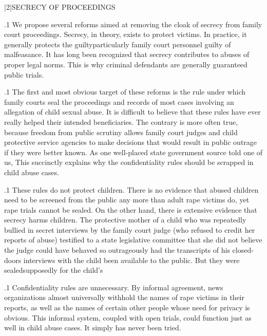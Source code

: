 \documentclass[11pt, twoside]{article}
\begin{document}
{\s|2|{SECRECY OF PROCEEDINGS}

\p.1{%
\noindent{}We propose several reforms aimed at removing the cloak of secrecy from
family court proceedings. Secrecy, in theory, exists to protect victims.
In practice, it generally protects the guilty\mdash{}particularly family court
personnel guilty of malfeasance. It has long been recognized that secrecy contributes to abuses of proper legal norms. This is why criminal
defendants are generally guaranteed public trials.
}%

\p.1{%
The first and most obvious target of these reforms is the  rule under which family courts seal the proceedings and records
of most cases involving an allegation of child sexual abuse. It is difficult
to believe that these rules have ever really helped their intended beneficiaries. The contrary is more often true, because freedom from public
scrutiny allows family court judges and child protective service agencies
to make decisions that would result in public outrage if they were better
known. As one well-placed state government source told one of us,  This succinctly explains why the confidentiality rules should be scrapped in child
abuse cases.
}%

\p.1{%
These rules do not protect children. There is no evidence that abused
children need to be screened from the public any more than adult rape
victims do, yet rape trials cannot be sealed. On the other hand, there is
extensive evidence that secrecy harms children. The protective mother
of a child who was repeatedly bullied in secret interviews by the family court judge (who refused to credit her reports of abuse) testified to
a state legislative committee that she did not believe the judge could
have behaved so outrageously had the transcripts of his closed-doors
interviews with the child been available to the public. But they were
sealed\mdash{}supposedly for the child’s 
}%

\p.1{%
Confidentiality rules are unnecessary. By informal agreement, news
organizations almost universally withhold the names of rape victims in
their reports, as well as the names of certain other people whose need
for privacy is obvious. This informal system, coupled with open trials,
could function just as well in child abuse cases. It simply has never been
tried.
}%

}
\end{document}
